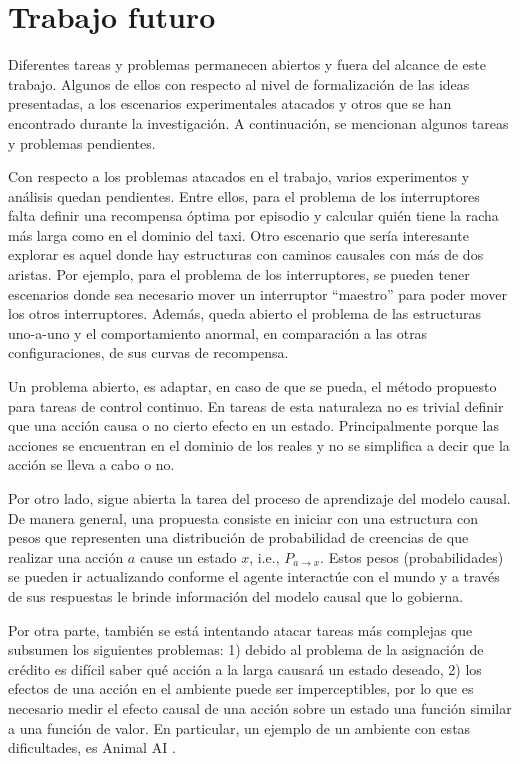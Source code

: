 \section{Trabajo futuro}

Diferentes tareas y problemas permanecen abiertos y fuera del alcance de este trabajo. Algunos de ellos con respecto al nivel de formalización de las ideas presentadas, a los escenarios experimentales atacados  y otros que se han encontrado durante la investigación. A continuación, se 
mencionan algunos tareas y problemas pendientes.

Con respecto a los problemas atacados en el trabajo,
varios experimentos y análisis quedan pendientes. Entre ellos, 
para el problema de los interruptores falta 
definir una recompensa óptima por episodio y 
calcular quién tiene la racha más larga como en el dominio del taxi.  Otro escenario que sería interesante
explorar es aquel donde hay estructuras con caminos causales con más de dos aristas. Por ejemplo, para el problema de los interruptores, se pueden
tener escenarios donde sea necesario mover un interruptor ``maestro'' para
poder mover los otros interruptores. Además, queda abierto el problema
de las estructuras uno-a-uno y el comportamiento anormal, en comparación
a las otras configuraciones, de sus curvas de recompensa.

Un problema abierto, es adaptar, en caso de que se pueda, el método propuesto para 
tareas de control continuo. En tareas de esta naturaleza no es trivial definir que una acción 
causa o no cierto efecto en un estado. Principalmente porque las acciones se encuentran
en el dominio de los reales y no se simplifica a decir que la acción se lleva a cabo o no.

Por otro lado, sigue abierta la tarea del proceso de aprendizaje del modelo
causal. De manera general, una propuesta consiste en iniciar con una estructura con pesos que representen 
una distribución de probabilidad de creencias de que realizar una acción $a$ cause un estado $x$, i.e., $P_{a\rightarrow x}$. Estos pesos (probabilidades) se pueden
ir actualizando conforme el agente interactúe con el mundo y
a través de sus respuestas le brinde información del modelo causal que lo gobierna.

Por otra parte, también se está intentando atacar tareas más 
complejas que subsumen los siguientes problemas: 1) debido al problema de la asignación de crédito es difícil saber qué acción a la larga causará un estado deseado, 2) los efectos de una acción en el ambiente puede ser imperceptibles, por lo que es necesario medir el efecto causal de una acción sobre un estado una función similar a una función de valor. En particular, un ejemplo de un ambiente con estas dificultades, es Animal AI \cite{beyret2019animalai}.




